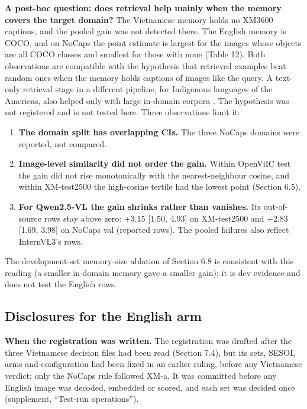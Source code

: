 \textbf{A post-hoc question: does retrieval help mainly when the memory covers the target domain?}
The Vietnamese memory holds no XM3600 captions, and the pooled gain was not detected there. The
English memory is COCO, and on NoCaps the point estimate is largest for the images whose objects are
all COCO classes and smallest for those with none (Table 12). Both observations are compatible with
the hypothesis that retrieved examples beat random ones when the memory holds captions of images
like the query. A text-only retrieval stage in a different pipeline, for Indigenous languages of the
Americas, also helped only with large in-domain corpora \citep{Dhawan2026Gators}. The hypothesis was
not registered and is not tested here. Three observations limit it:

\begin{enumerate}
\def\labelenumi{\arabic{enumi}.}
\tightlist
\item
  \textbf{The domain split has overlapping CIs.} The three NoCaps domains were reported, not
  compared.
\item
  \textbf{Image-level similarity did not order the gain.} Within OpenViIC test the gain did not rise
  monotonically with the nearest-neighbour cosine, and within XM-test2500 the high-cosine tertile
  had the lowest point (Section 6.5).
\item
  \textbf{For Qwen2.5-VL the gain shrinks rather than vanishes.} Its out-of-source rows stay above
  zero: +3.15 {[}1.50, 4.93{]} on XM-test2500 and +2.83 {[}1.69, 3.98{]} on NoCaps val (reported
  rows). The pooled failures also reflect InternVL3's rows.
\end{enumerate}

The development-set memory-size ablation of Section 6.8 is consistent with this reading (a smaller
in-domain memory gave a smaller gain); it is dev evidence and does not test the English rows.

\subsection{Disclosures for the English arm}\label{disclosures-for-the-english-arm}

\textbf{When the registration was written.} The registration was drafted after the three Vietnamese
decision files had been read (Section 7.4), but its sets, SESOI, arms and configuration had been
fixed in an earlier ruling, before any Vietnamese verdict; only the NoCaps rule followed XM-a. It
was committed before any English image was decoded, embedded or scored, and each set was decided
once (supplement, ``Test-run operations'').

